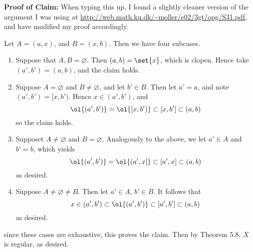 \documentclass{fkpset}
\begin{document}
\begin{solution}
\begin{enumerate}[label=(\arabic*)]
        \textbf{Proof of Claim:} {\color{red} When typing this up, I
          found a slightly cleaner version of the argument I was using
          at \url{http://web.math.ku.dk/~moller/e02/3gt/opg/S31.pdf},
          and have modified my proof accordingly.}

        Let $A = (a, x)$, and $B = (x, b)$. Then we have four
        subcases.
        \begin{enumerate}[label=\roman*)]
          \item Suppose that $A,B = \varnothing$. Then $(a,b) =
            \set{x}$, which is clopen. Hence take $(a',b') = (a,b)$,
            and the claim holds. \cmark
          \item Suppose $A = \varnothing$ and $B \neq \varnothing$,
            and let $b' \in B$. Then let $a'=a$, and note $(a',b') =
            [x, b')$. Hence $x \in (a',b')$, and
            \[
              \ol{(a', b')} = \ol{[x, b')} \subset [x,b'] \subset
              (a,b)
            \]
            so the claim holds. \cmark
          \item Supposet $A \neq \varnothing$ and $B = \varnothing$.
            Analogously to the above, we let $a' \in A$ and $b'=b$,
            which yields
            \[
              \ol{(a',b')} = \ol{(a',x]} \subset [a',x] \subset (a,b)
            \]
            as desired. \cmark
          \item Suppose $A \neq \varnothing \neq B$. Then let $a' \in
            A$, $b' \in B$. It follows that
            \[
              x \in (a',b') \subset \ol{(a',b')} \subset [a',b']
              \subset (a,b)
            \]
            as desired. \cmark
        \end{enumerate}
        since these cases are exhaustive, this proves the claim. Then
        by Theorem 5.8, $X$ is regular, as desired.
    \end{enumerate}
  \end{solution}
  \clearpage
\end{document}
